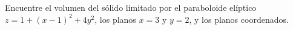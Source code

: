 \item Encuentre el volumen del sólido limitado por el paraboloide elíptico $z = 1 + (x - 1)^2 + 4y^2$, los planos $x = 3$ y $y = 2$, y los planos coordenados.
